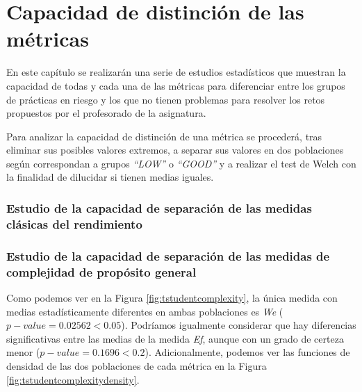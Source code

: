 \chapter{Capacidad de distinción de las métricas}\label{sec:diferencias}

En este capítulo se realizarán una serie de estudios estadísticos que muestran la capacidad de todas y cada una de las métricas para diferenciar entre los grupos de prácticas en riesgo y los que no tienen problemas para resolver los retos propuestos por el profesorado de la asignatura.

Para analizar la capacidad de distinción de una métrica se procederá, tras eliminar sus posibles valores extremos, a separar sus valores en dos poblaciones según correspondan a grupos \emph{``LOW''} o \emph{``GOOD''} y a realizar el test de Welch con la finalidad de dilucidar si tienen medias iguales.

\subsection{Estudio de la capacidad de separación de las medidas clásicas del rendimiento}

\subsection{Estudio de la capacidad de separación de las medidas de complejidad de propósito general}

Como podemos ver en la Figura \ref{fig:tstudentcomplexity}, la única medida con medias estadísticamente diferentes en ambas poblaciones es \emph{We} ($p-value = 0.02562 < 0.05$). Podríamos igualmente considerar que hay diferencias significativas entre las medias de la medida \emph{Ef}, aunque con un grado de certeza menor ($p-value = 0.1696 < 0.2$). Adicionalmente, podemos ver las funciones de densidad de las dos poblaciones de cada métrica en la Figura \ref{fig:tstudentcomplexitydensity}.

